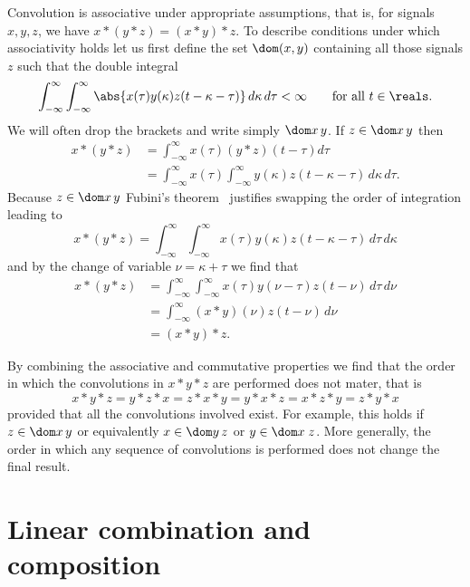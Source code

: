 Convolution is associative under appropriate assumptions, that is, for signals $x,y,z$, we have $x*(y*z) = (x*y)*z$.  To describe conditions under which associativity holds let us first define the set $\dom(x,y)$ containing all those signals $z$ such that the double integral
\[
\int_{-\infty}^\infty \int_{-\infty}^\infty  \abs{x(\tau)y(\kappa)z(t - \kappa - \tau)} \, d\kappa \, d\tau < \infty \qquad \text{for all $t \in \reals$}.
\] 
We will often drop the brackets and write simply $\dom x\,y$.  If $z \in \dom x\,y$ then 
\begin{align*}
x*(y*z) &= \int_{-\infty}^\infty x(\tau) (y*z)(t - \tau) d\tau \\
&= \int_{-\infty}^\infty  x(\tau) \int_{-\infty}^\infty y(\kappa) z(t - \kappa - \tau) \, d\kappa \, d\tau.
\end{align*}
Because $z \in \dom x\,y$ Fubini's theorem~\cite[Theorem~8.8]{Rudin_real_and_complex_analysis} justifies swapping the order of integration leading to
\[
x*(y*z) = \int_{-\infty}^\infty  \int_{-\infty}^\infty x(\tau) y(\kappa) z(t - \kappa - \tau) \, d\tau \, d\kappa 
\]
and by the change of variable $\nu = \kappa + \tau$ we find that
\begin{align*}
x*(y*z) &= \int_{-\infty}^\infty  \int_{-\infty}^\infty x(\tau) y(\nu - \tau)  z(t - \nu) \, d\tau \, d\nu \\
&= \int_{-\infty}^\infty  (x*y)(\nu)  z(t - \nu)  \, d\nu \\
&= (x*y)*z.
\end{align*}

By combining the associative and commutative properties we find that the order in which the convolutions in $x * y * z$ are performed does not mater, that is
\[
x*y*z = y*z*x = z*x*y = y*x*z = x*z*y = z*y*x
\]
provided that all the convolutions involved exist.  For example, this holds if $z \in \dom x\,y$ or equivalently $x \in \dom y\,z$ or $y \in \dom x\;z$.  More generally, the order in which any sequence of convolutions is performed does not change the final result.

\section{Linear combination and composition}\label{sec:line-comb-comp}


